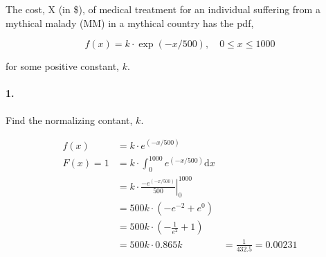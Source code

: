 


\renewcommand\assignment{Worksheet 1, Due February 15, 4:15pm}


    \iffalse
    \begin{equation*}
        \begin{gathered}
            Equations go here.
        \end{gathered}
    \end{equation*}

    \resizebox{\hsize}{!}{$Long equation goes here$}

    \begin{multicol*}{# of columns}
    \end{multicol*}

    \horizontal

    \fi


    The cost, X (in \$), of medical treatment for an individual suffering from a mythical malady (MM) in a mythical country has the pdf,

    \begin{equation*}
        f(x) = k \cdot \exp(-x/500), \quad 0 \leq x \leq 1000
    \end{equation*}

    for some positive constant, $k$.

    \paragraph*{1.}
    Find the normalizing contant, $k$.
    \\
    \begin{mdframed}
        \begin{align*}
            f(x)    & = k \cdot e^{(-x/500)}                                        \\
            F(x) = 1& = k \cdot \int_{0}^{1000}e^{(-x/500)}\mathrm{d}x              \\
                    & = k \cdot \left.\frac{-e^{(-x/500)}}{500}\right|_{0}^{1000}   \\
                    & = 500k \cdot (-e^{-2} + e^{0})                                \\
                    & = 500k \cdot (-\frac{1}{e^2} + 1)                             \\
                    & = 500k \cdot 0.865
            k       & = \frac{1}{432.5} = \boxed{0.00231}
        \end{align*}
    \end{mdframed}

